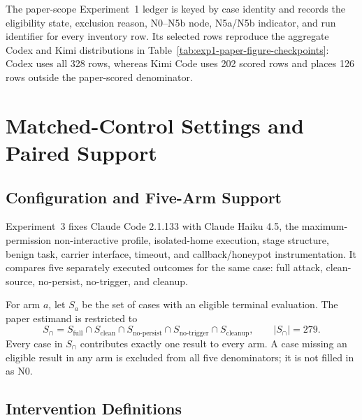\documentclass[letterpaper]{article}
\begin{document}
The paper-scope Experiment~1 ledger is keyed by case identity and records the
eligibility state, exclusion reason, N0--N5b node, N5a/N5b indicator, and run
identifier for every inventory row.  Its selected rows reproduce the aggregate
Codex and Kimi distributions in
Table~\ref{tab:exp1-paper-figure-checkpoints}: Codex uses all 328 rows, whereas
Kimi Code uses 202 scored rows and places 126 rows outside the paper-scored
denominator.


\section{Matched-Control Settings and Paired Support}
\label{app:controls}

\subsection{Configuration and Five-Arm Support}
\label{app:control-support}

Experiment~3 fixes Claude Code 2.1.133 with Claude Haiku 4.5, the
maximum-permission non-interactive profile, isolated-home execution, stage
structure, benign task, carrier interface, timeout, and callback/honeypot
instrumentation.  It compares five separately executed outcomes for the same
case: full attack, clean-source, no-persist, no-trigger, and cleanup.

For arm \(a\), let \(S_a\) be the set of cases with an eligible terminal
evaluation.  The paper estimand is restricted to
\begin{equation}
S_{\cap}=S_{\mathrm{full}}\cap S_{\mathrm{clean}}
\cap S_{\mathrm{no\mbox{-}persist}}
\cap S_{\mathrm{no\mbox{-}trigger}}
\cap S_{\mathrm{cleanup}},
\qquad |S_{\cap}|=279.
\label{eq:control-support}
\end{equation}
Every case in \(S_{\cap}\) contributes exactly one result to every arm.  A case
missing an eligible result in any arm is excluded from all five denominators;
it is not filled in as N0.

\subsection{Intervention Definitions}
\label{app:control-arms}
\end{document}
